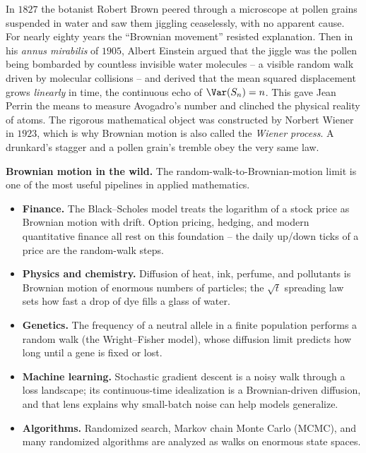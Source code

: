 \begin{historybox}
In $1827$ the botanist Robert Brown peered through a microscope at pollen grains
suspended in water and saw them jiggling ceaselessly, with no apparent cause.
For nearly eighty years the ``Brownian movement'' resisted explanation. Then in
his \emph{annus mirabilis} of $1905$, Albert Einstein argued that the jiggle was
the pollen being bombarded by countless invisible water molecules -- a visible
random walk driven by molecular collisions -- and derived that the mean squared
displacement grows \emph{linearly} in time, the continuous echo of $\Var(S_n) =
n$. This gave Jean Perrin the means to measure Avogadro's number and clinched
the physical reality of atoms. The rigorous mathematical object was constructed
by Norbert Wiener in $1923$, which is why Brownian motion is also called the
\emph{Wiener process}. A drunkard's stagger and a pollen grain's tremble obey
the very same law.
\end{historybox}

\begin{applicationbox}
\textbf{Brownian motion in the wild.} The random-walk-to-Brownian-motion limit
is one of the most useful pipelines in applied mathematics.
\begin{itemize}
\item \textbf{Finance.} The Black--Scholes model treats the logarithm of a
stock price as Brownian motion with drift. Option pricing, hedging, and modern
quantitative finance all rest on this foundation -- the daily up/down ticks of a
price are the random-walk steps.
\item \textbf{Physics and chemistry.} Diffusion of heat, ink, perfume, and
pollutants is Brownian motion of enormous numbers of particles; the
$\sqrt{t}$ spreading law sets how fast a drop of dye fills a glass of water.
\item \textbf{Genetics.} The frequency of a neutral allele in a finite
population performs a random walk (the Wright--Fisher model), whose
diffusion limit predicts how long until a gene is fixed or lost.
\item \textbf{Machine learning.} Stochastic gradient descent is a noisy walk
through a loss landscape; its continuous-time idealization is a Brownian-driven
diffusion, and that lens explains why small-batch noise can help models
generalize.
\item \textbf{Algorithms.} Randomized search, Markov chain Monte Carlo (MCMC),
and many randomized algorithms are analyzed as walks on enormous state spaces.
\end{itemize}
\end{applicationbox}


